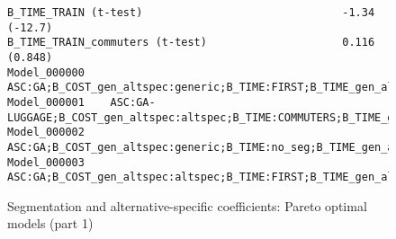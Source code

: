 \documentclass[12pt,a4paper]{article}
\begin{document}
\begin{landscape}
\begin{figure}[p]
\begin{lstlisting}[basicstyle=\scriptsize]
B_TIME_TRAIN (t-test)                               -1.34  (-12.7)                                    
B_TIME_TRAIN_commuters (t-test)                     0.116  (0.848)                                                               
Model_000000	ASC:GA;B_COST_gen_altspec:generic;B_TIME:FIRST;B_TIME_gen_altspec:generic
Model_000001	ASC:GA-LUGGAGE;B_COST_gen_altspec:altspec;B_TIME:COMMUTERS;B_TIME_gen_altspec:altspec
Model_000002	ASC:GA;B_COST_gen_altspec:generic;B_TIME:no_seg;B_TIME_gen_altspec:generic
Model_000003	ASC:GA;B_COST_gen_altspec:altspec;B_TIME:FIRST;B_TIME_gen_altspec:generic
\end{lstlisting}
\caption{\label{fig:b05alt_spec_segmentation}Segmentation and alternative-specific coefficients: Pareto optimal models (part 1)}
  \end{figure}
\end{landscape}
\end{document}
